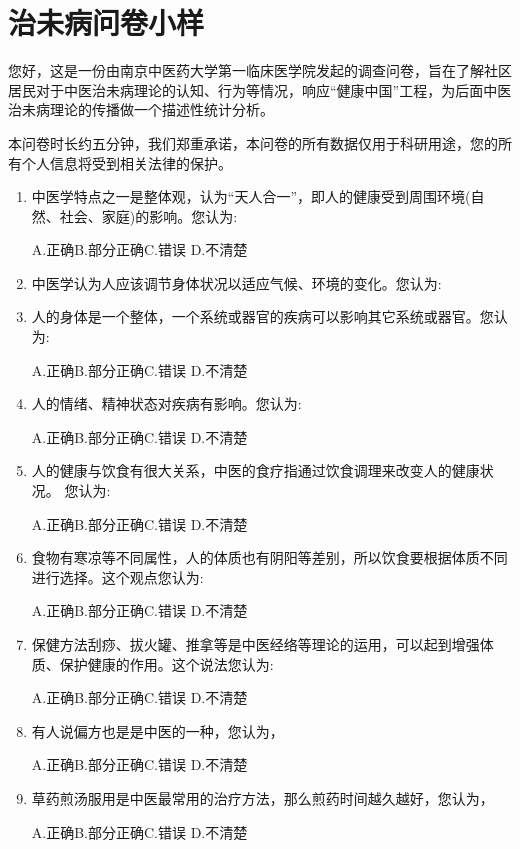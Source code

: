 \section{治未病问卷小样}
您好，这是一份由南京中医药大学第一临床医学院发起的调查问卷，旨在了解社区居民对于中医治未病理论的认知、行为等情况，响应“健康中国”工程，为后面中医治未病理论的传播做一个描述性统计分析。

本问卷时长约五分钟，我们郑重承诺，本问卷的所有数据仅用于科研用途，您的所有个人信息将受到相关法律的保护。

\begin{enumerate}
\item 中医学特点之一是整体观，认为“天人合一”，即人的健康受到周围环境(自然、社会、家庭)的影响。您认为:

A.正确\qquad B.部分正确\qquad C.错误 \qquad D.不清楚

\item 中医学认为人应该调节身体状况以适应气候、环境的变化。您认为:
\item 人的身体是一个整体，一个系统或器官的疾病可以影响其它系统或器官。您认为:

A.正确\qquad B.部分正确\qquad C.错误 \qquad D.不清楚

\item 人的情绪、精神状态对疾病有影响。您认为:

A.正确\qquad B.部分正确\qquad C.错误 \qquad D.不清楚

\item 人的健康与饮食有很大关系，中医的食疗指通过饮食调理来改变人的健康状况。
您认为:

A.正确\qquad B.部分正确\qquad C.错误 \qquad D.不清楚

\item 食物有寒凉等不同属性，人的体质也有阴阳等差别，所以饮食要根据体质不同进行选择。这个观点您认为:

A.正确\qquad B.部分正确\qquad C.错误 \qquad D.不清楚
\item 保健方法刮痧、拔火罐、推拿等是中医经络等理论的运用，可以起到增强体质、保护健康的作用。这个说法您认为:

A.正确\qquad B.部分正确\qquad C.错误 \qquad D.不清楚
\item 有人说偏方也是是中医的一种，您认为，

A.正确\qquad B.部分正确\qquad C.错误 \qquad D.不清楚

\item
草药煎汤服用是中医最常用的治疗方法，那么煎药时间越久越好，您认为，

A.正确\qquad B.部分正确\qquad C.错误 \qquad D.不清楚


\end{enumerate}

